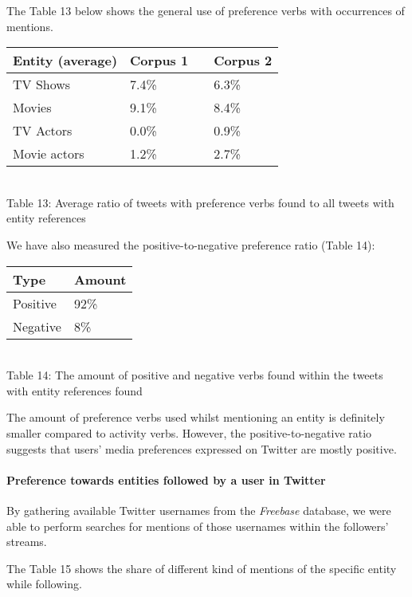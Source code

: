 The Table 13 below shows the general use of preference verbs with occurrences of
mentions.

\begin{center}
  \begin{tabular}{ | p{4cm} | p{2cm} | p{1cm}| p{2cm} | } \hline
    Entity (average) & Corpus 1 & & Corpus 2 \\ \hline
    TV Shows & 7.4\% & & 6.3\% \\ \hline
    Movies & 9.1\% & & 8.4\% \\ \hline
    TV Actors & 0.0\% & & 0.9\% \\ \hline
    Movie actors & 1.2\% & & 2.7\% \\ \hline
  \end{tabular} \\
  Table 13: Average ratio of tweets with preference verbs found to all tweets with entity references \\
\end{center}

We have also measured the positive-to-negative preference ratio (Table 14):

\begin{center}
  \begin{tabular}{ | p{3cm}| p{2cm} | } \hline
    Type & Amount \\ \hline
    Positive & 92\% \\ \hline
    Negative & 8\% \\ \hline
  \end{tabular} \\
  Table 14: The amount of positive and negative verbs found within the tweets with entity references found \\
\end{center}

The amount of preference verbs used whilst mentioning an entity is definitely
smaller compared to activity verbs. However, the positive-to-negative ratio suggests that users'
media preferences expressed on Twitter are mostly positive.

\paragraph{Preference towards entities followed by a user in Twitter}
By gathering available Twitter usernames from the \textit{Freebase} database,
we were able to perform searches for mentions of those usernames within the followers' streams.

The Table 15 shows the share of different kind of mentions of the specific entity while following.

